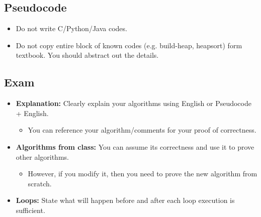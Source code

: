 \subsection{Pseudocode}
\begin{warning}
    \begin{itemize}
        \item Do not write C/Python/Java codes.
        \item Do not copy entire block of known codes (e.g. build-heap, heapsort) form textbook. You should abstract out the details.
    \end{itemize}
\end{warning}

\subsection{Exam}
\begin{warning}
    \begin{itemize}
        \item \textbf{Explanation:} Clearly explain your algorithms using English or Pseudocode + English. 
        \begin{itemize}
            \item You can reference your algorithm/comments for your proof of correctness.
        \end{itemize}
        \item \textbf{Algorithms from class:} You can assume its correctness and use it to prove other algorithms. 
        \begin{itemize}
            \item However, if you modify it, then you need to prove the new algorithm from scratch.
        \end{itemize}
        \item \textbf{Loops:} State what will happen before and after each loop execution is sufficient. 
    \end{itemize}
\end{warning}